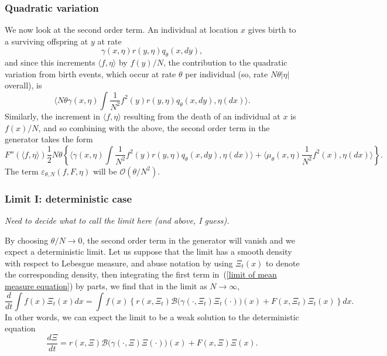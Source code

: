 \documentclass[12pt]{article}
\newcommand{\bigO}{\mathcal{O}}
\newcommand{\DG}{\mathcal{B}}  %
\newcommand{\comment}[1]{{\color{blue} \it #1}}
\begin{document}
\subsubsection*{Quadratic variation}


We now look at the second order term.
An individual at location $x$ gives birth 
to a surviving offspring at $y$ at rate
$$
\gamma(x,\eta) r(y,\eta) q_{\theta}(x, dy) ,
$$
and since this increments $\langle f, \eta \rangle$ by $f(y) / N$,
the contribution to the quadratic variation from birth events,
which occur at rate $\theta$ per individual 
(so, rate $N\theta |\eta|$ overall), is
$$
\langle
    N \theta \gamma(x,\eta)
    \int \frac{1}{N^2} f^2(y) r(y,\eta)
    q_\theta(x,dy) 
    , \eta(dx)
\rangle .
$$
Similarly, the increment in $\langle f, \eta\rangle$ resulting from 
the death of an individual at $x$ is $f(x)/N$, and so combining with the 
above, the second order term in the generator takes the form
$$
F''(\langle f,\eta\rangle)
\frac{1}{2} N \theta
\left\{
    \langle
        \gamma(x,\eta)
        \int \frac{1}{N^2}f^2(y)r(y,\eta)q_\theta(x,dy) 
    , \eta(dx)\rangle
    +
    \langle
        \mu_\theta(x,\eta)\frac{1}{N^2}f^2(x) 
    ,\eta(dx)\rangle
\right\} .
$$
The term $\varepsilon_{\theta,N}(f, F, \eta)$ will be 
$\bigO(\theta/N^2)$.

\subsubsection*{Limit I: deterministic case}

\comment{Need to decide what to call the limit here (and above, I guess).}

By choosing $\theta/N\rightarrow 0$, the second order term in the generator 
will vanish and we expect a deterministic limit. 
Let us suppose that the limit has a smooth density with respect to
Lebesgue measure, and abuse notation by using $\Xi_t(x)$
to denote the corresponding density, then integrating the first term in~(\ref{limit of mean measure equation})
by parts, we find that in the limit as $N\to\infty$,
\begin{equation*}
\frac{d}{dt}\int f(x)\Xi_t(x)dx
=
\int f(x)\left\{r(x,\Xi_t)\DG\big(\gamma(\cdot,\Xi_t)
\Xi_t(\cdot)\big)(x)
+
F(x,\Xi_t) \Xi_t(x)
\right\} dx.
\end{equation*}
In other words, we can expect the limit to be a weak solution to the 
deterministic equation
\begin{equation}
\label{deterministic limit}
\frac{d\Xi}{dt}
=r(x,\Xi)\DG\big(\gamma(\cdot,\Xi)
\Xi(\cdot)\big)(x)+F(x,\Xi)
\Xi(x).
\end{equation}
\end{document}
